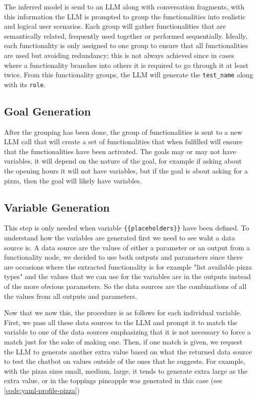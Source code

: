 The inferred model is send to an \ac{LLM} along with conversation fragments,
with this information the \ac{LLM} is prompted to
group the functionalities into realistic and logical user scenarios.
Each group will gather functionalities that are semantically related,
frequently used together or performed sequentially.
Ideally, each functionality is only assigned to one group
to ensure that all functionalities are used but avoiding redundancy;
this is not always achieved since in cases where a functionality branches into others
it is required to go through it at least twice.
From this functionality groups, the \ac{LLM} will generate
the \texttt{test\_name} along with its \texttt{role}.

\subsection{Goal Generation}

After the grouping has been done,
the group of functionalities is sent to a new \ac{LLM} call
that will create a set of functionalities that when fulfilled
will ensure that the functionalities have been activated.
The goals may or may not have variables,
it will depend on the nature of the goal,
for example if asking about the opening hours it will not have variables,
but if the goal is about asking for a pizza,
then the goal will likely have variables.

\subsection{Variable Generation}

This step is only needed when variable \texttt{\{\{placeholders\}\}} have been defined.
To understand how the variables are generated first we need to see waht a data source is.
A data source are the values of either a parameter or an output from a functionality node,
we decided to use both outputs and parameters since there are occasions
where the extracted functionality is for example "list available pizza types"
and the values that we can use for the variables
are in the outputs instead of the more obvious parameters.
So the data sources are the combinations of all the values
from all outputs and parameters.

Now that we now this, the procedure is as follows for each individual variable.
First, we pass all these data sources to the \ac{LLM}
and prompt it to match the variable to one of the data sources
emphasizing that it is not necessary to force a match
just for the sake of making one.
Then, if one match is given,
we request the \ac{LLM} to generate another extra value
based on what the returned data source
to test the chatbot on values outside of the ones that he suggests.
For example, with the pizza sizes small, medium, large,
it tends to generate extra large as the extra value,
or in the toppings pineapple was generated in this case (see \autoref{code:yaml-profile-pizza})

